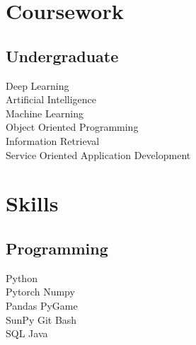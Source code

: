 \documentclass[]{deedy-resume-openfont}
\begin{document}
\begin{minipage}[t]{0.33\textwidth}
\section{Coursework}

\subsection{Undergraduate}
\textbullet{}Deep Learning \\
\textbullet{}Artificial Intelligence \\
\textbullet{}Machine Learning \\
\textbullet{}Object Oriented Programming \\
\textbullet{}Information Retrieval \\
\textbullet{}Service Oriented Application Development  \\
\sectionsep



\section{Skills}
\subsection{Programming}
Python \\
Pytorch  \textbullet{} Numpy \\
Pandas  \textbullet{} PyGame  \\
SunPy \textbullet{}
Git  \textbullet{} Bash \\
SQL  \textbullet{} Java
\sectionsep


\end{minipage}
\end{document}
